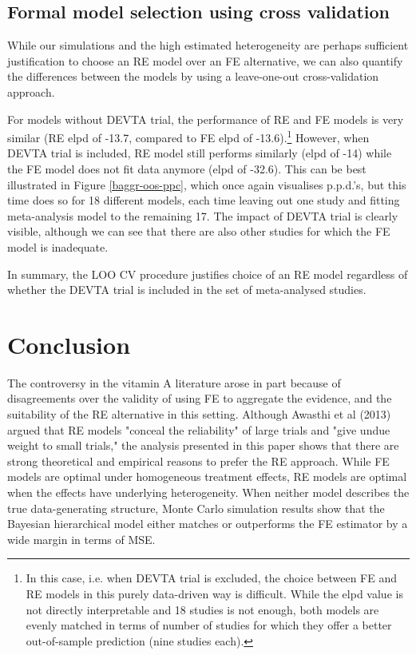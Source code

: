 \documentclass[12pt]{article}
\begin{document}
\subsection{Formal model selection using cross validation}

While our simulations and the high estimated heterogeneity are perhaps sufficient justification to choose an RE model over an FE alternative, we can also quantify the differences between the models by using a leave-one-out cross-validation approach.

For models without DEVTA trial, the performance of RE and FE models is very similar (RE elpd of -13.7, compared to FE elpd of -13.6).\footnote{In this case, i.e. when DEVTA trial is excluded, the choice between FE and RE models in this purely data-driven way is difficult. While the elpd value is not directly interpretable and 18 studies is not enough, both models are evenly matched in terms of number of studies for which they offer a better out-of-sample prediction (nine studies each).} However, when DEVTA trial is included, RE model still performs similarly (elpd of -14) while the FE model does not fit data anymore (elpd of -32.6). This can be best illustrated in Figure \ref{baggr-oos-ppc}, which once again visualises p.p.d.'s, but this time does so for 18 different models, each time leaving out one study and fitting meta-analysis model to the remaining 17. The impact of DEVTA trial is clearly visible, although we can see that there are also other studies for which the FE model is inadequate.

In summary, the LOO CV procedure justifies choice of an RE model regardless of whether the DEVTA trial is included in the set of meta-analysed studies.




\section{Conclusion}

The controversy in the vitamin A literature arose in part because of disagreements over the validity of using FE to aggregate the evidence, and the suitability of the RE alternative in this setting. Although Awasthi et al (2013) argued that RE models "conceal the reliability" of large trials and "give undue weight to small trials," the analysis presented in this paper shows that there are strong theoretical and empirical reasons to prefer the RE approach. While FE models are optimal under homogeneous treatment effects, RE models are optimal when the effects have underlying heterogeneity. When neither model describes the true data-generating structure, Monte Carlo simulation results show that the Bayesian hierarchical model either matches or outperforms the FE estimator by a wide margin in terms of MSE.
\end{document}

